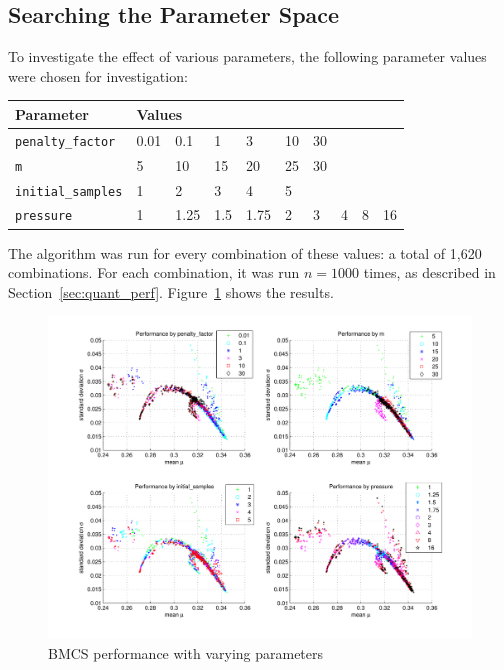 \documentclass[10pt]{article}
\begin{document}
\subsection{Searching the Parameter Space}

To investigate the effect of various parameters, the following parameter
values were chosen for investigation:

\vspace{5pt}

\begin{tabular}{l | l l l l l l l l l}
  Parameter & \multicolumn{9}{l}{Values} \\
  \hline
  \texttt{penalty\_factor} & 0.01 & 0.1 & 1 & 3 & 10 & 30 \\
  \texttt{m} & 5 & 10 & 15 & 20 & 25 & 30 \\
  \texttt{initial\_samples} & 1 & 2 & 3 & 4 & 5 \\
  \texttt{pressure} & 1 & 1.25 & 1.5 & 1.75 & 2 & 3 & 4 & 8 & 16
  \end{tabular}

\vspace{5pt}

The algorithm was run for every combination of these values: a total of 1,620
combinations. For each combination, it was run $n = 1000$ times, as described
in Section~\ref{sec:quant_perf}. Figure~\ref{fig:bmcs_perf_scatters} shows the
results.

\begin{figure}
  \advance\leftskip-1cm
  \includegraphics[clip, trim=1.5cm 0.75cm 1.5cm 0.75cm, width=18.5cm]{bmcs_perf_scatters.pdf}
  \caption{BMCS performance with varying parameters}
  \label{fig:bmcs_perf_scatters}
  \end{figure}
\end{document}
